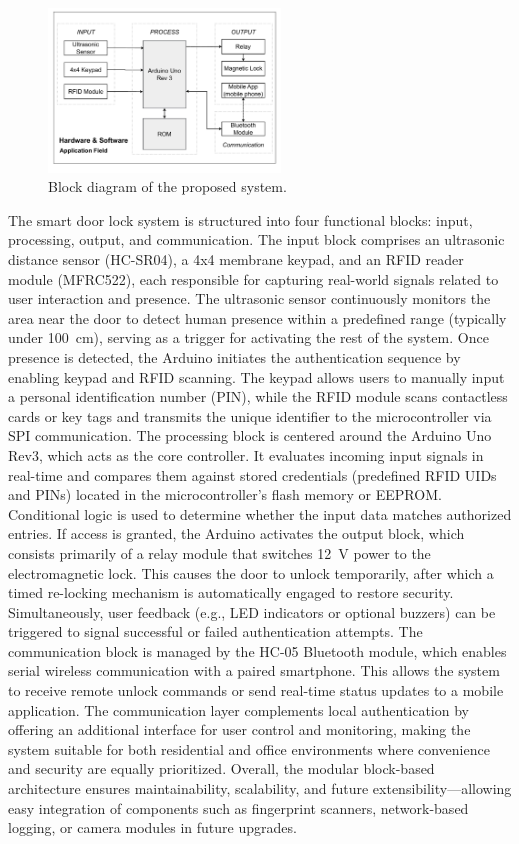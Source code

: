\documentclass[conference, onecolumn]{IEEEtran}
\begin{document}
\begin{figure}[H]
	\centering
	\includegraphics[width=0.55\textwidth]{blockdia (1).pdf}
	\caption{Block diagram of the proposed system.}
	\label{fig2}
\end{figure}
The smart door lock system is structured into four functional blocks: input, processing, output, and communication. The input block comprises an ultrasonic distance sensor (HC-SR04), a 4x4 membrane keypad, and an RFID reader module (MFRC522), each responsible for capturing real-world signals related to user interaction and presence. The ultrasonic sensor continuously monitors the area near the door to detect human presence within a predefined range (typically under 100~cm), serving as a trigger for activating the rest of the system. Once presence is detected, the Arduino initiates the authentication sequence by enabling keypad and RFID scanning. The keypad allows users to manually input a personal identification number (PIN), while the RFID module scans contactless cards or key tags and transmits the unique identifier to the microcontroller via SPI communication. The processing block is centered around the Arduino Uno Rev3, which acts as the core controller. It evaluates incoming input signals in real-time and compares them against stored credentials (predefined RFID UIDs and PINs) located in the microcontroller’s flash memory or EEPROM. Conditional logic is used to determine whether the input data matches authorized entries. If access is granted, the Arduino activates the output block, which consists primarily of a relay module that switches 12~V power to the electromagnetic lock. This causes the door to unlock temporarily, after which a timed re-locking mechanism is automatically engaged to restore security. Simultaneously, user feedback (e.g., LED indicators or optional buzzers) can be triggered to signal successful or failed authentication attempts. The communication block is managed by the HC-05 Bluetooth module, which enables serial wireless communication with a paired smartphone. This allows the system to receive remote unlock commands or send real-time status updates to a mobile application. The communication layer complements local authentication by offering an additional interface for user control and monitoring, making the system suitable for both residential and office environments where convenience and security are equally prioritized. Overall, the modular block-based architecture ensures maintainability, scalability, and future extensibility—allowing easy integration of components such as fingerprint scanners, network-based logging, or camera modules in future upgrades.
\end{document}
